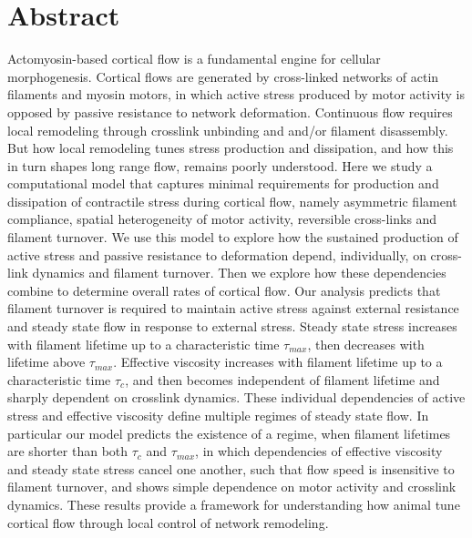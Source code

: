 \documentclass[10pt,letterpaper]{article}
\begin{document}
\section*{Abstract}
Actomyosin-based cortical flow is a fundamental engine for cellular morphogenesis.  Cortical flows are generated by cross-linked networks of actin filaments and myosin motors, in which active stress produced by motor activity is opposed by passive resistance to network deformation.  Continuous flow requires local remodeling through crosslink unbinding and and/or filament disassembly. But how local remodeling tunes stress production and dissipation, and how this in turn shapes long range flow, remains poorly understood. Here we study a computational model that captures minimal requirements for production and dissipation of contractile stress during cortical flow, namely asymmetric filament compliance, spatial heterogeneity of motor activity, reversible cross-links and filament turnover.  We use this model to explore how the sustained production of active stress and passive resistance to deformation depend, individually, on cross-link dynamics and filament turnover.  Then we explore how these dependencies combine to determine overall rates of cortical flow. Our analysis predicts that filament turnover is required to maintain active stress against external resistance and steady state flow in response to external stress. Steady state stress increases with filament lifetime up to a characteristic time $\tau_{max}$, then decreases with lifetime above $\tau_{max}$.   Effective viscosity increases with filament lifetime up to a characteristic time $\tau_c$, and then becomes independent of filament lifetime and sharply dependent on crosslink dynamics.  These individual dependencies of active stress and effective viscosity define multiple regimes of steady state flow.  In particular our model predicts the existence of a regime, when filament lifetimes are shorter than both $\tau_c$ and $\tau_{max}$, in which dependencies of effective viscosity and steady state stress cancel one another, such that flow speed is insensitive to filament turnover, and shows simple dependence on motor activity and crosslink dynamics.  These results provide a framework for understanding how animal tune cortical flow through local control of network remodeling.

\end{document}
